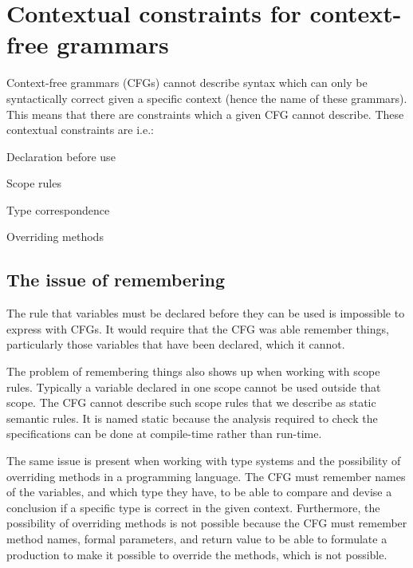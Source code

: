 \section{Contextual constraints for context-free grammars}
\label{sec:contextualconstraints}

Context-free grammars (CFGs) cannot describe syntax which can only be
syntactically correct given a specific context (hence the name of these
grammars). This means that there are constraints which a given CFG cannot
describe.
These contextual constraints are i.e.:
\cite[p. 39]{plpp}

\begin{dlist}
\item Declaration before use
\item Scope rules
\item Type correspondence
\item Overriding methods
\end{dlist}


\subsection{The issue of remembering}

The rule that variables must be declared before they can be used is impossible
to express with CFGs. It would require that the CFG was able remember things,
particularly those variables that have been declared, which it cannot. 

The problem of remembering things also shows up when working with scope rules.
Typically a variable declared in one scope cannot be used outside that scope.
The CFG cannot describe such scope rules that we describe as static semantic
rules. It is named static because the analysis required to check the
specifications can be done at compile-time rather than run-time.
\cite[p. 153]{sebesta2013}

The same issue is present when working with type systems and the possibility of
overriding methods in a programming language. The CFG must remember names of the
variables, and which type they have, to be able to compare and devise a conclusion
if a specific type is correct in the given context. Furthermore, the possibility
of overriding methods is not possible because the CFG must remember method
names, formal parameters, and return value to be able to formulate a production
to make it possible to override the methods, which is not possible.

